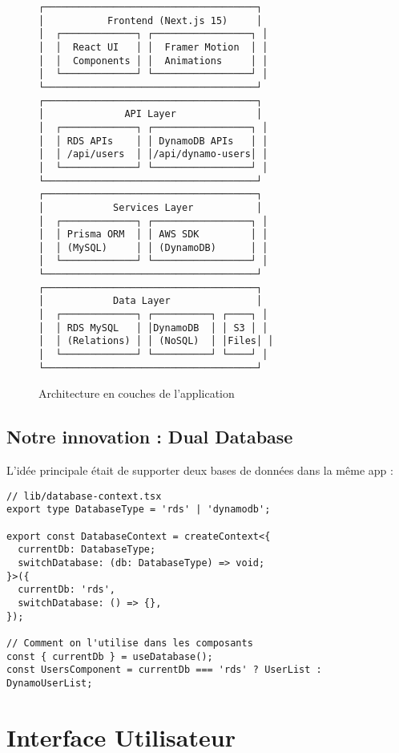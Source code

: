 \documentclass[12pt,a4paper]{report}
\begin{document}
\begin{figure}[H]
\centering
\begin{verbatim}
┌─────────────────────────────────────┐
│           Frontend (Next.js 15)     │
│  ┌─────────────┐ ┌─────────────────┐ │
│  │  React UI   │ │  Framer Motion  │ │
│  │  Components │ │  Animations     │ │
│  └─────────────┘ └─────────────────┘ │
└─────────────────────────────────────┘
┌─────────────────────────────────────┐
│              API Layer              │
│  ┌─────────────┐ ┌─────────────────┐ │
│  │ RDS APIs    │ │ DynamoDB APIs   │ │
│  │ /api/users  │ │/api/dynamo-users│ │
│  └─────────────┘ └─────────────────┘ │
└─────────────────────────────────────┘
┌─────────────────────────────────────┐
│            Services Layer           │
│  ┌─────────────┐ ┌─────────────────┐ │
│  │ Prisma ORM  │ │ AWS SDK         │ │
│  │ (MySQL)     │ │ (DynamoDB)      │ │
│  └─────────────┘ └─────────────────┘ │
└─────────────────────────────────────┘
┌─────────────────────────────────────┐
│            Data Layer               │
│  ┌─────────────┐ ┌──────────┐ ┌────┐ │
│  │ RDS MySQL   │ │DynamoDB  │ │ S3 │ │
│  │ (Relations) │ │ (NoSQL)  │ │Files│ │
│  └─────────────┘ └──────────┘ └────┘ │
└─────────────────────────────────────┘
\end{verbatim}
\caption{Architecture en couches de l'application}
\end{figure}

\section{Notre innovation : Dual Database}

L'idée principale était de supporter deux bases de données dans la même app :

\begin{lstlisting}[caption=Contexte de base de données avec TypeScript]
// lib/database-context.tsx
export type DatabaseType = 'rds' | 'dynamodb';

export const DatabaseContext = createContext<{
  currentDb: DatabaseType;
  switchDatabase: (db: DatabaseType) => void;
}>({
  currentDb: 'rds',
  switchDatabase: () => {},
});

// Comment on l'utilise dans les composants
const { currentDb } = useDatabase();
const UsersComponent = currentDb === 'rds' ? UserList : DynamoUserList;
\end{lstlisting}

\chapter{Interface Utilisateur}
\end{document}

